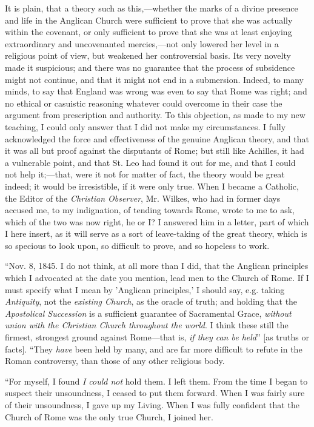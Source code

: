 It is plain, that a theory such as this,—whether the marks
of a divine presence and life in the Anglican Church were sufficient to
prove that she was actually within the covenant, or only sufficient to
prove that she was at least enjoying extraordinary and uncovenanted
mercies,—not only lowered her level in a religious point of
view, but weakened her controversial basis. Its very novelty made it
suspicious; and there was no guarantee that the process of subsidence
might not continue, and that it might not end in a submersion. Indeed,
to many minds, to say that England was wrong was even to say that Rome
was right; and no ethical or casuistic reasoning whatever could
overcome in their case the argument from prescription and authority. To
this objection, as made to my new teaching, I could only answer
that I did not make my circumstances. I fully acknowledged the force and
effectiveness of the genuine Anglican theory, and that it was all but
proof against the disputants of Rome; but still like Achilles, it had a
vulnerable point, and that St. Leo had found it out for me, and that I
could not help it;—that, were it not for matter of fact, the theory
would be great indeed; it would be irresistible, if it were only true.
When I became a Catholic, the Editor of the \emph{Christian Observer},
Mr. Wilkes, who had in
former days accused me, to my indignation, of tending towards Rome,
wrote to me to ask, which of the two was now right, he or I? I answered
him in a letter, part of which I here insert, as it will serve as a sort
of leave-taking of the great theory, which is so specious to look upon,
so difficult to prove, and so hopeless to work.

``Nov. 8, 1845. I do not think, at all more than I did, that the
Anglican principles which I advocated at the date you mention,
lead men to the Church of Rome. If I must specify what I mean by
'Anglican principles,' I should say, e.g. taking \emph{Antiquity}, not
the \emph{existing Church}, as the oracle of truth; and holding that the
\emph{Apostolical Succession} is a sufficient guarantee of Sacramental
Grace, \emph{without union with the Christian Church throughout
the world}. I think these still the firmest, strongest ground against
Rome—that is, \emph{if they can be held}'' [as truths or facts].
``They \emph{have} been held by many, and are far more difficult
to refute in the Roman controversy, than those of any other religious
body.

``For myself, I found \emph{I could not} hold them. I left them.
From the time I began to suspect their unsoundness, I ceased to put them
forward. When I was fairly sure of their unsoundness, I gave up my
Living. When I was fully confident that the Church of Rome was the only
true Church, I joined her.

